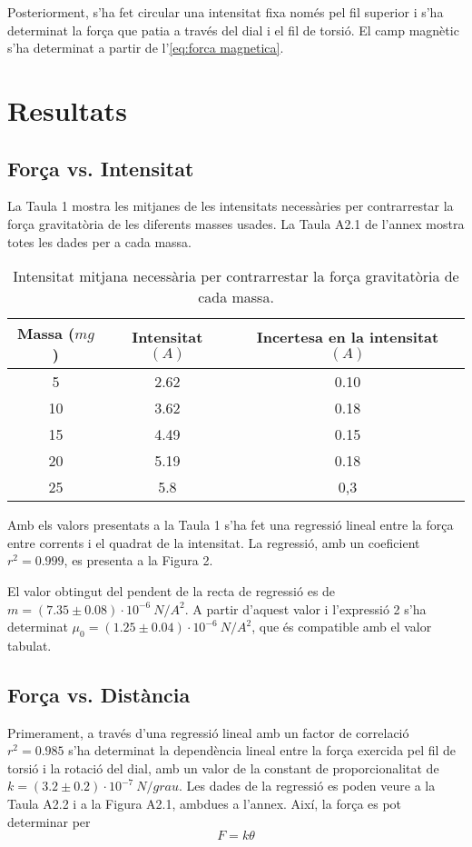 \begin{multicols}{2}
	Posteriorment, s'ha fet circular una intensitat fixa només pel fil superior i s'ha determinat la força que patia a través del dial i el fil de torsió. El camp magnètic s'ha determinat a partir de l'\cref{eq:forca magnetica}. 
	\section{Resultats}
	\subsection{Força vs. Intensitat}
	La Taula 1 mostra les mitjanes de les intensitats necessàries per contrarrestar la força gravitatòria de les diferents masses usades. La Taula A2.1 %
	de l'annex mostra totes les dades per a cada massa.

	\begin{table}
		\centering
		\caption{Intensitat mitjana necessària per contrarrestar la força gravitatòria de cada massa.}
		\vspace{0.5cm}
		\begin{tabular}{|c|c|c|}
			\hline
			\textbf{Massa ($\si{mg}$)}&\textbf{Intensitat} $\si{(A)}$& \textbf{Incertesa en la intensitat} $\si{(A)}$\\ \hline
			5 & 2.62 & 0.10 \\ \hline
			10 & 3.62 & 0.18 \\ \hline 
			15 & 4.49 & 0.15 \\ \hline 
			20 & 5.19 & 0.18 \\ \hline 
			25 & 5.8 & 0,3 \\ \hline  
		\end{tabular}
	\end{table}
	Amb els valors presentats a la Taula 1 s'ha fet una regressió lineal entre la força entre corrents i el quadrat de la intensitat. La regressió, amb un coeficient $r^2=0.999$, es presenta a la Figura 2.

	El valor obtingut del pendent de la recta de regressió es de $m=(7.35\pm0.08)\cdot10^{-6}\ \si{N/A^2}$. A partir d'aquest valor i l'expressió 2 s'ha determinat $\mu_0=(1.25\pm0.04)\cdot10^{-6}\ \si{N/A^2}$, que és compatible amb el valor tabulat.
	\subsection{Força vs. Distància}
	Primerament, a través d'una regressió lineal amb un factor de correlació $r^2=0.985$ s'ha determinat la dependència lineal entre la força exercida pel fil de torsió i la rotació del dial, amb un valor de la constant de proporcionalitat de $k=(3.2\pm0.2)\cdot10^{-7}\ \si{N/grau}$. Les dades de la regressió es poden veure a la Taula A2.2 i a la Figura A2.1, ambdues a l'annex. Així, la força es pot determinar per
	\begin{equation}
		F=k\theta
	\end{equation}


\end{multicols}
